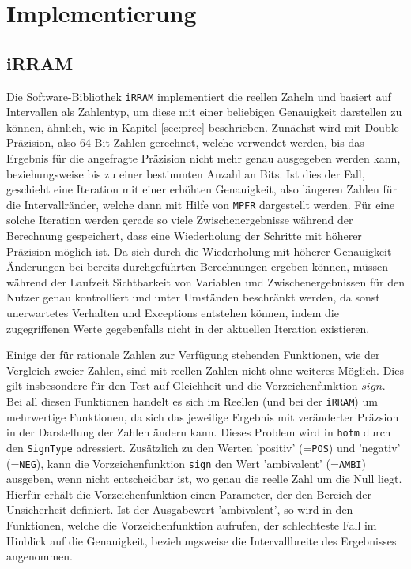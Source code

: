 
\chapter{Implementierung}
\label{ch:Implementierung}



\section{iRRAM}
\label{sec:irram}
Die Software-Bibliothek \verb+iRRAM+ \cite{Mller2009EnhancingIE} implementiert die reellen Zaheln und basiert auf Intervallen als Zahlentyp, um diese mit einer beliebigen Genauigkeit darstellen zu können, ähnlich, wie in Kapitel \ref{sec:prec} beschrieben. Zunächst wird mit Double-Präzision, also 64-Bit Zahlen gerechnet, welche verwendet werden, bis das Ergebnis für die angefragte Präzision nicht mehr genau ausgegeben werden kann, beziehungsweise bis zu einer bestimmten Anzahl an Bits. Ist dies der Fall, geschieht eine Iteration mit einer erhöhten Genauigkeit, also längeren Zahlen für die Intervallränder, welche dann mit Hilfe von \verb+MPFR+ dargestellt werden.
Für eine solche Iteration werden gerade so viele Zwischenergebnisse während der Berechnung gespeichert, dass eine Wiederholung der Schritte mit höherer Präzision möglich ist. Da sich durch die Wiederholung mit höherer Genauigkeit Änderungen bei bereits durchgeführten Berechnungen ergeben können, müssen während der Laufzeit Sichtbarkeit von Variablen und Zwischenergebnissen für den Nutzer genau kontrolliert und unter Umständen beschränkt werden, da sonst unerwartetes Verhalten und Exceptions entstehen können, indem die zugegriffenen Werte gegebenfalls nicht in der aktuellen Iteration existieren.


Einige der für rationale Zahlen zur Verfügung stehenden Funktionen, wie der Vergleich zweier Zahlen, sind mit reellen Zahlen nicht ohne weiteres Möglich. Dies gilt insbesondere für den Test auf Gleichheit und die Vorzeichenfunktion $sign$. Bei all diesen Funktionen handelt es sich im Reellen (und bei der \verb+iRRAM+) um mehrwertige Funktionen, da sich das jeweilige Ergebnis mit veränderter Präzsion in der Darstellung der Zahlen ändern kann. Dieses Problem wird in \verb+hotm+ durch den \verb+SignType+ adressiert. Zusätzlich zu den Werten 'positiv' (=\verb+POS+) und 'negativ' (=\verb+NEG+),  kann die Vorzeichenfunktion \verb+sign+ den Wert 'ambivalent' (=\verb+AMBI+) ausgeben, wenn nicht entscheidbar ist, wo genau die reelle Zahl um die Null liegt. Hierfür erhält die Vorzeichenfunktion einen Parameter, der den Bereich der Unsicherheit definiert. Ist der Ausgabewert 'ambivalent', so wird in den Funktionen, welche die Vorzeichenfunktion aufrufen, der schlechteste Fall im Hinblick auf die Genauigkeit, beziehungsweise die Intervallbreite des Ergebnisses angenommen. 



